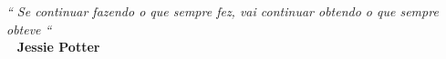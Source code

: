 \def\textoEpigrafe{
Se continuar fazendo o que sempre fez, vai continuar obtendo
o que sempre obteve
}

\def\autorEpigrafe{Jessie Potter}

\begin{epigrafe}
  \vspace*{\fill}
  \hfill{}
  \parbox{6cm}{
    \begin{flushright}
      \textit{``\textoEpigrafe``}\\
      \bigbreak\
      \textbf{\autorEpigrafe}
  
    \end{flushright}
  }
\end{epigrafe}